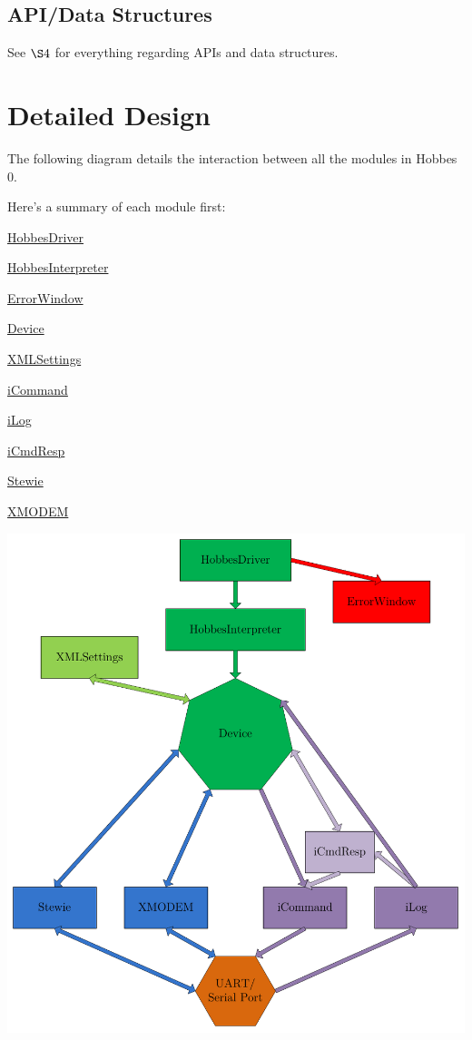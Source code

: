 \documentclass[12pt,letterpaper]{article}
\begin{document}
%
%
\subsection{API/Data Structures}
\label{3.1}

See \hyperref[4]{$\S4$} for everything regarding APIs and data structures.



%
%
\section{Detailed Design}
\label{4}

The following diagram details the interaction between all the modules in Hobbes 0.

Here's a summary of each module first:

{
\color{green}
\hyperref[4.0]{HobbesDriver}
}

{
\color{green}
\hyperref[4.1]{HobbesInterpreter}
}

{
\color{red}
\hyperref[4.2]{ErrorWindow}
}

{
\color{green}
\hyperref[4.3]{Device}
}

{
\color{lightgreen}
\hyperref[4.4]{XMLSettings}
}

{
\color{purple}
\hyperref[4.5]{iCommand}
}

{
\color{purple}
\hyperref[4.6]{iLog}
}

{
\color{lightpurple}
\hyperref[4.7]{iCmdResp}
}

{
\color{blue}
\hyperref[4.8]{Stewie}
}

{
\color{blue}
\hyperref[4.9]{XMODEM}
}


\begin{center}
\includegraphics[scale=1]{hobbes_design.pdf}
\end{center}
\end{document}
